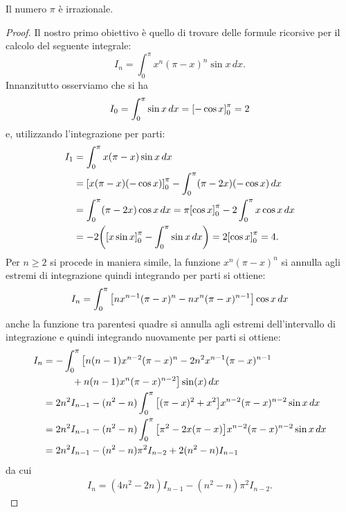 \begin{theorem}[irrazionalità di $\pi$]
Il numero $\pi$ è irrazionale.
\end{theorem}
%
\begin{proof}
Il nostro primo obiettivo è quello di trovare delle formule
ricorsive per il calcolo del seguente integrale:
\[
  I_n = \int_0^\pi x^n (\pi-x)^n \sin x\, dx.
\]
Innanzitutto osserviamo che si ha
\[
  I_0 = \int_0^\pi \sin x\, dx = {\left[ -\cos x \right]}_0^\pi = 2
\]
e, utilizzando l'integrazione per parti:
\begin{align*}
  I_1 &= \int_0^\pi x(\pi-x)\sin x\, dx\\
      &= {\left[ x(\pi-x)(-\cos x) \right]}_0^\pi
       -\int_0^\pi (\pi-2x)(-\cos x)\, dx \\
      &= \int_0^\pi (\pi-2x)\cos x\, dx
      = \pi {\left[ \cos x \right]}_0^\pi - 2 \int_0^\pi x\cos x\, dx \\
      &= - 2 {\left( {\left[ x\sin x \right]}_0^\pi - \int_0^\pi \sin x\, dx \right)}
      = 2 {\left[ \cos x \right]}_0^\pi = 4.
\end{align*}
Per $n\ge 2$ si procede in maniera simile,
la funzione $x^n (\pi-x)^n$ si
annulla agli estremi di integrazione quindi integrando per parti
 si ottiene:
\[
  I_n = \int_0^\pi {\left[ n x^{n-1}(\pi-x)^n - n x^n (\pi-x)^{n-1} \right]} \cos x\, dx
\]
anche la funzione tra parentesi quadre si annulla
agli estremi dell'intervallo di integrazione e quindi integrando nuovamente
per parti si ottiene:
\begin{align*}
  I_n &= -\int_0^\pi \big[n(n-1) x^{n-2}(\pi-x)^n
    - 2n^2 x^{n-1}(\pi-x)^{n-1} \\
  &\qquad\quad   + n(n-1) x^n(\pi-x)^{n-2}\big] \sin(x)\, dx \\
  &= 2n^2 I_{n-1} - (n^2-n) \int_0^\pi {\left[ (\pi-x)^2 + x^2 \right]}x^{n-2}(\pi-x)^{n-2} \sin x\, dx \\
  &= 2n^2 I_{n-1} - (n^2-n) \int_0^\pi {\left[ \pi^2 - 2x(\pi-x) \right]}x^{n-2}(\pi-x)^{n-2}\sin x\, dx \\
  &= 2n^2 I_{n-1} - (n^2-n) \pi^2 I_{n-2} + 2(n^2-n) I_{n-1}
\end{align*}
da cui
\begin{align}\label{eq:9530978}
   I_n = (4n^2-2n)I_{n-1} -(n^2-n)\pi^2 I_{n-2}.
\end{align}


\end{proof}
